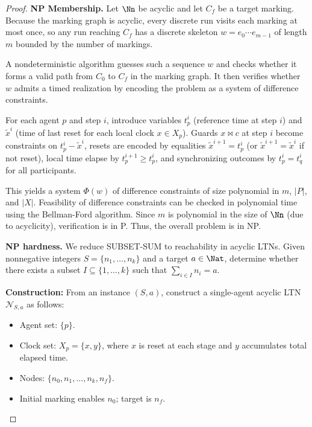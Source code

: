 \begin{proof}
\textbf{NP Membership.} 
Let $\Nn$ be acyclic and let $C_f$ be a target marking. Because the marking graph is acyclic, every discrete run visits each marking at most once, so any run reaching $C_f$ has a discrete skeleton $w = e_0 \cdots e_{m-1}$ of length $m$ bounded by the number of markings.

A nondeterministic algorithm guesses such a sequence $w$ and checks whether it forms a valid path from $C_0$ to $C_f$ in the marking graph. It then verifies whether $w$ admits a timed realization by encoding the problem as a system of difference constraints.

For each agent $p$ and step $i$, introduce variables $t_p^i$ (reference time at step $i$) and $\tilde{x}^i$ (time of last reset for each local clock $x \in X_p$). Guards $x \bowtie c$ at step $i$ become constraints on $t_p^i - \tilde{x}^i$, resets are encoded by equalities $\tilde{x}^{i+1} = t_p^i$ (or $\tilde{x}^{i+1} = \tilde{x}^i$ if not reset), local time elapse by $t_p^{i+1} \ge t_p^i$, and synchronizing outcomes by $t_p^i = t_q^i$ for all participants.

This yields a system $\Phi(w)$ of difference constraints of size polynomial in $m$, $|P|$, and $|X|$. Feasibility of difference constraints can be checked in polynomial time using the Bellman-Ford algorithm. 
Since $m$ is polynomial in the size of $\Nn$ (due to acyclicity), verification is in P. Thus, the overall problem is in NP.

\textbf{NP hardness.} We reduce SUBSET-SUM to reachability in acyclic LTNs. 
Given nonnegative integers $S = \{n_1, \ldots, n_k\}$ and a target $a \in \Nat$, determine whether there exists a subset $I \subseteq \{1, \ldots, k\}$ such that $\sum_{i \in I} n_i = a$.

\textbf{Construction:}
From an instance $(S, a)$, construct a single-agent acyclic LTN $\mathcal{N}_{S,a}$ as follows:
\begin{itemize}
\item Agent set: $\{p\}$.
\item Clock set: $X_p = \{x, y\}$, where $x$ is reset at each stage and $y$ accumulates total elapsed time.
\item Nodes: $\{n_0, n_1, \ldots, n_k, n_f\}$.
\item Initial marking enables $n_0$; target is $n_f$.
\end{itemize}


\end{proof}
